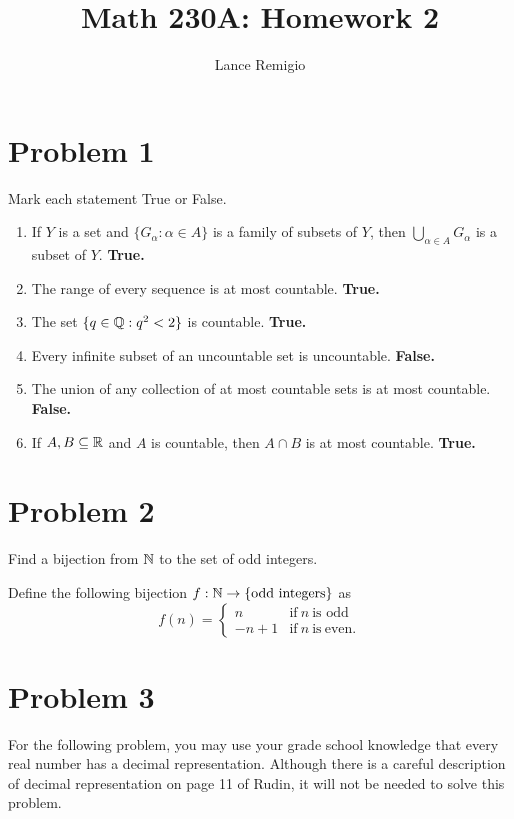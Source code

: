 \documentclass[11pt,a4paper]{article}
\title{Math 230A: Homework 2}
\author{Lance Remigio}
\begin{document}
\maketitle

\section*{Problem 1} Mark each statement True or False.

\begin{enumerate} 
    \item If \( Y  \) is a set and \( \{ {G}_{\alpha} : \alpha \in A  \}   \) is a family of subsets of \( Y  \), then \( \bigcup_{ \alpha \in A  }^{  }  {G}_{\alpha} \) is a subset of \( Y  \). \textbf{True.}
    \item The range of every sequence is at most countable. \textbf{True.}
    \item The set \( \{ q \in \mathbb{Q} : q^{2} < 2  \}  \) is countable. \textbf{True.}     
    \item Every infinite subset of an uncountable set is uncountable. \textbf{False.} 
    \item The union of any collection of at most countable sets is at most countable. \textbf{False.}
    \item If \( A,B \subseteq \mathbb{R}  \) and \( A  \) is countable, then \( A \cap B  \) is at most countable. \textbf{True.}
\end{enumerate}

\section*{Problem 2} Find a bijection from \( \mathbb{N}  \) to the set of odd integers.
\begin{solution}
    Define the following bijection \( f: \mathbb{N} \to \{ \text{odd integers}  \}  \) as
    \[  f(n) = 
    \begin{cases}
        n &\text{if} \ n \ \text{is odd} \\   
        -n + 1 &\text{if} \  n \ \text{is} \ \text{even}.
    \end{cases} \]
\end{solution}

\section*{Problem 3} For the following problem, you may use your grade school knowledge that every real number has a decimal representation. Although there is a careful description of decimal representation on page 11 of Rudin, it will not be needed to solve this problem. 
\end{document}
